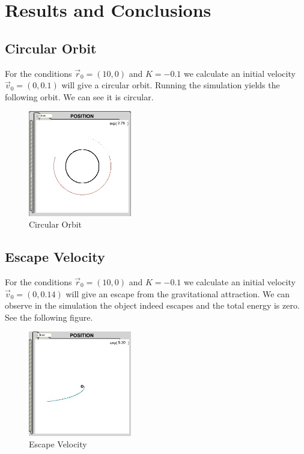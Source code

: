 \documentclass{article}
\begin{document}
\newpage 

\section{Results and Conclusions}

\subsection{Circular Orbit}
For the conditions $\overrightarrow{r}_0=(10,0)$ and $K=-0.1$ we calculate an initial velocity $\overrightarrow{v}_0=(0,0.1)$ will give a circular orbit.  Running the simulation yields the following orbit.  We can see it is circular.

\begin{figure}[h]
\begin{center}
\includegraphics[width=0.4\textwidth]{circular} %
\caption{Circular Orbit}
\end{center}
\end{figure}

\subsection{Escape Velocity}
For the conditions $\overrightarrow{r}_0=(10,0)$ and $K=-0.1$ we calculate an initial velocity $\overrightarrow{v}_0=(0,0.14)$ will give an escape from the gravitational attraction.  We can observe in the simulation the object indeed escapes and the total energy is zero.  See the following figure.

\begin{figure}[h]
\begin{center}
\includegraphics[width=0.4\textwidth]{escape} %
\caption{Escape Velocity}
\end{center}
\end{figure}
\end{document}
